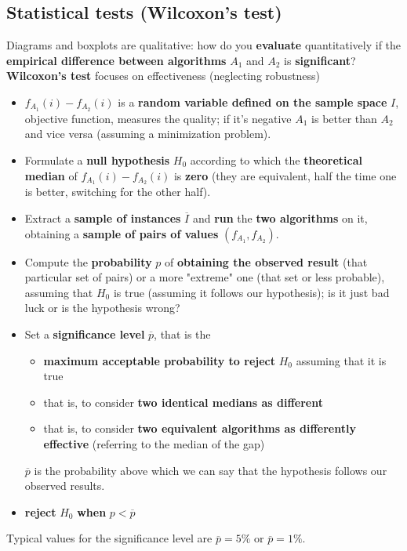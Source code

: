 \documentclass[11pt]{article}
\begin{document}
	\newpage
	
	\subsection{Statistical tests (Wilcoxon's test)}
	Diagrams and boxplots are qualitative: how do you \textbf{evaluate} quantitatively if the \textbf{empirical difference between algorithms} $A_1$ and $A_2$ is \textbf{significant}?\\
	
	\textbf{Wilcoxon's test} focuses on effectiveness (neglecting robustness)
	\begin{itemize}
		\item $f_{A_1} (i) - f_{A_2} (i)$ is a \textbf{random variable defined on the sample space} $I$, objective function, measures the quality; if it's negative $A_1$ is better than $A_2$ and vice versa (assuming a minimization problem).\\
		
		\item Formulate a \textbf{null hypothesis} $H_0$ according to which the \textbf{theoretical median} of $f_{A_1} (i) - f_{A_2} (i)$ is \textbf{zero} (they are equivalent, half the time one is better, switching for the other half).\\
		
		\item Extract a \textbf{sample of instances} $\overline{I}$ and \textbf{run} the \textbf{two algorithms} on it, obtaining a \textbf{sample of pairs of values} $(f_{A_1}, f_{A_2})$.\\
		
		\item Compute the \textbf{probability} $p$ of \textbf{obtaining the observed result} (that particular set of pairs) or a more "extreme" one (that set or less probable), assuming that $H_0$ is true (assuming it follows our hypothesis); is it just bad luck or is the hypothesis wrong? \\
		
		\item Set a \textbf{significance level} $\overline{p}$, that is the
		\begin{itemize}
			\item \textbf{maximum acceptable probability to reject} $H_0$ assuming that it is true
			\item that is, to consider \textbf{two identical medians as different}
			\item that is, to consider \textbf{two equivalent algorithms as differently effective} (referring to the median of the gap)
		\end{itemize}
		$\overline{p}$ is the probability above which we can say that the hypothesis follows our observed results.\\
		
		\item \textbf{reject} $H_0$ \textbf{when} $p < \overline{p}$
	\end{itemize}
	Typical values for the significance level are $\overline{p} = 5\%$ or $\overline{p} = 1\%$.\\
	
\end{document}
